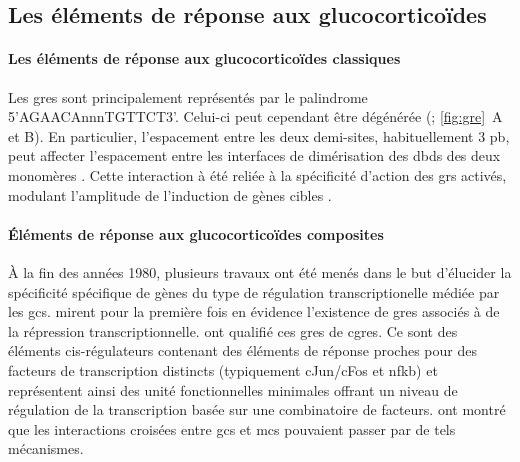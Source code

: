 \documentclass[../main.tex]{subfiles}
\begin{document}
\subsection{Les éléments de réponse aux glucocorticoïdes}

\paragraph{Les éléments de réponse aux glucocorticoïdes classiques}
Les \glspl{gre} sont principalement représentés par le palindrome 5'AGAACAnnnTGTTCT3'.
Celui-ci peut cependant être dégénérée (\citealp{Nordeen1990}; \autoref{fig:gre}~A et B).
En particulier, l'espacement entre les deux demi-sites, habituellement 3 \gls{pb}, peut affecter l'espacement entre les interfaces de dimérisation des \glspl{dbd} des deux monomères \citep{Watson2013}.
Cette interaction à été reliée à la spécificité d'action des \glspl{gr} activés, modulant l'amplitude de l'induction de gènes cibles \citep{Meijsing2009}.
	


\paragraph{Éléments de réponse aux glucocorticoïdes composites}
À la fin des années 1980, plusieurs travaux ont été menés dans le but d'élucider la spécificité spécifique de gènes du type de régulation transcriptionelle médiée par les \glspl{gc}.
\citet{Sakai1988} mirent pour la première fois en évidence l'existence de \glspl{gre} associés à de la répression transcriptionnelle.
\citet{Diamond1990} ont qualifié ces \glspl{gre} de \glspl{cgre}.
Ce sont des éléments cis-régulateurs contenant des éléments de réponse proches pour des facteurs de transcription distincts (typiquement cJun/cFos et \gls{nfkb}) et représentent ainsi des unité fonctionnelles minimales offrant un niveau de régulation de la transcription basée sur une combinatoire de facteurs.
\citet{Pearce1993} ont montré que les interactions croisées entre \glspl{gc} et \glspl{mc} pouvaient passer par de tels mécanismes.
\end{document}
